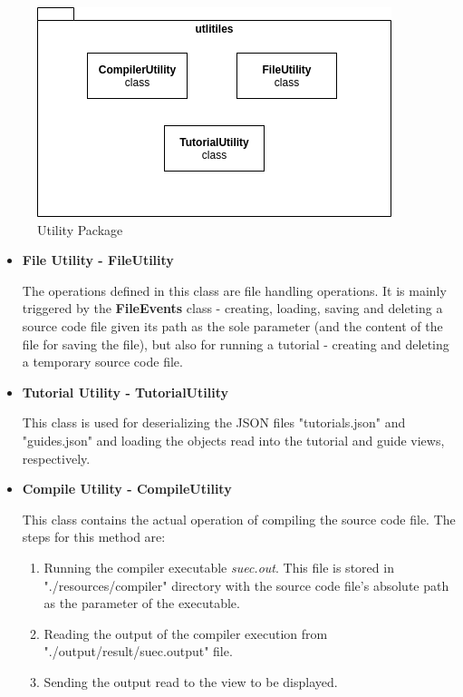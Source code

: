 \documentclass[12pt,a4paper,twoside]{report}
\begin{document}
\begin{enumerate}
\begin{figure}[H]
    \centering
    \includegraphics[width=0.6\linewidth]{img/diags/UtilityPackage.png}
    \caption{Utility Package}
    \label{fig:conf}
\end{figure}

\begin{itemize}
\item \textbf{File Utility - FileUtility}
	
	The operations defined in this class are file handling operations. It is mainly triggered by the \textbf{FileEvents} class - creating, loading, saving and deleting a source code file given its path as the sole parameter (and the content of the file for saving the file), but also for running a tutorial - creating and deleting a temporary source code file.
\item \textbf{Tutorial Utility - TutorialUtility}

	This class is used for deserializing the JSON files "tutorials.json" and "guides.json" and loading the objects read into the tutorial and guide views, respectively.

\item \textbf{Compile Utility - CompileUtility}
	
	This class contains the actual operation of compiling the source code file. The steps for this method are: 
	\begin{enumerate}
	\item Running the compiler executable \textit{suec.out}. This file is stored in "./resources/compiler" directory with the source code file's absolute path as the parameter of the executable.
	\item Reading the output of the compiler execution from "./output/result/suec.output" file.
	\item Sending the output read to the view to be displayed.
	\end{enumerate}
\end{itemize}
\end{enumerate}
\end{document}
